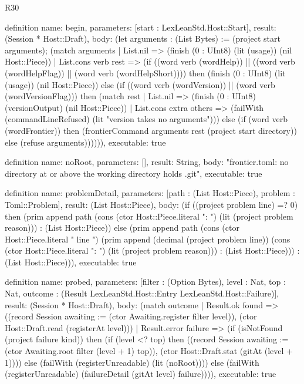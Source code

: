 \begin{lexlean}{R30}
\begin{semanticmodule}
definition{
  name: begin,
  parameters: [start : LexLeanStd.Host::Start],
  result: (Session * Host::Draft),
  body: (let arguments : (List Bytes) := (project start arguments); (match arguments
    | List.nil => (finish (0 : UInt8) (lit (usage)) (nil Host::Piece))
    | List.cons verb rest => (if ((word verb (wordHelp)) || ((word verb (wordHelpFlag)) || (word verb (wordHelpShort)))) then (finish (0 : UInt8) (lit (usage)) (nil Host::Piece)) else (if ((word verb (wordVersion)) || (word verb (wordVersionFlag))) then (match rest
      | List.nil => (finish (0 : UInt8) (versionOutput) (nil Host::Piece))
      | List.cons extra others => (failWith (commandLineRefused) (lit "version takes no arguments"))) else (if (word verb (wordFrontier)) then (frontierCommand arguments rest (project start directory)) else (refuse arguments)))))),
  executable: true
}

definition{
  name: noRoot,
  parameters: [],
  result: String,
  body: "frontier.toml: no directory at or above the working directory holds .git",
  executable: true
}

definition{
  name: problemDetail,
  parameters: [path : (List Host::Piece), problem : Toml::Problem],
  result: (List Host::Piece),
  body: (if ((project problem line) =? 0) then (prim append path (cons (ctor Host::Piece.literal ": ") (lit (project problem reason))) : (List Host::Piece)) else (prim append path (cons (ctor Host::Piece.literal " line ") (prim append (decimal (project problem line)) (cons (ctor Host::Piece.literal ": ") (lit (project problem reason))) : (List Host::Piece))) : (List Host::Piece))),
  executable: true
}

definition{
  name: probed,
  parameters: [filter : (Option Bytes), level : Nat, top : Nat, outcome : (Result LexLeanStd.Host::Entry LexLeanStd.Host::Failure)],
  result: (Session * Host::Draft),
  body: (match outcome
    | Result.ok found => ((record Session {awaiting := (ctor Awaiting.register filter level)}), (ctor Host::Draft.read (registerAt level)))
    | Result.error failure => (if (isNotFound (project failure kind)) then (if (level <? top) then ((record Session {awaiting := (ctor Awaiting.root filter (level + 1) top)}), (ctor Host::Draft.stat (gitAt (level + 1)))) else (failWith (registerUnreadable) (lit (noRoot)))) else (failWith (registerUnreadable) (failureDetail (gitAt level) failure)))),
  executable: true
}


\end{semanticmodule}
\end{lexlean}

